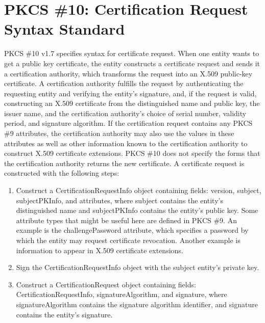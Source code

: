 \documentclass{article}
\begin{document}
\section{PKCS \#10: Certification Request Syntax Standard}
\label{pkcs10}
PKCS \#10 v1.7 specifies syntax for certificate request. When
one entity wants to get a public key certificate, the entity constructs
a certificate request and sends it a certification authority, 
which transforms the request into an X.509 public-key certificate.
A certification authority fulfills the request by authenticating 
the requesting entity and verifying the entity's signature, and, 
if the request is valid, constructing an X.509 certificate from 
the distinguished name and public key, the issuer name, and the 
certification authority's choice of serial number, validity 
period, and signature algorithm. If the certification request 
contains any PKCS \#9 attributes, the certification authority 
may also use the values in these attributes as well as other 
information known to the certification authority to construct 
X.509 certificate extensions. PKCS \#10 does not specify the forms that
the certification authority returns the new certificate.
A certificate request is constructed with the following steps:
\begin{enumerate}
\item Construct a {CertificationRequestInfo} object containing fields:
{version, subject, subjectPKInfo}, and {attributes},
where {subject} contains the entity's distinguished name and
{subjectPKInfo} contains the entity's public key.
Some attribute types that might be useful here are defined in PKCS \#9. 
An example is the challengePassword attribute, which specifies a 
password by which the entity may request certificate revocation. 
Another example is information to appear in X.509 certificate extensions.
\item Sign the {CertificationRequestInfo} object with 
the subject entity's private key.
\item Construct a {CertificationRequest} object containing
fields: {CertificationRequestInfo}, {signatureAlgorithm},
and {signature}, where  {signatureAlgorithm} contains the signature 
algorithm identifier, and  {signature} contains the entity's 
signature.
\end{enumerate}
\end{document}
